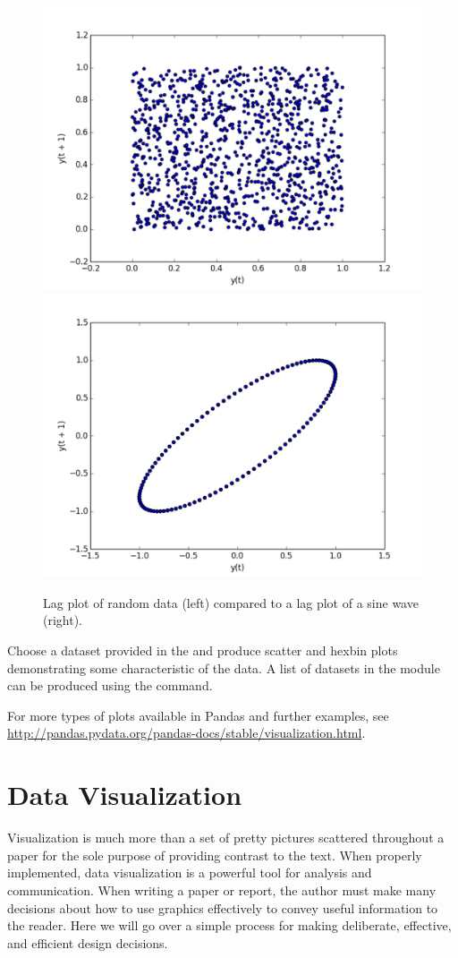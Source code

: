 \begin{figure}[H]
    \centering
    \includegraphics[width=.49\textwidth]{randomdata.pdf}
    \includegraphics[width=.49\textwidth]{structureddata.pdf}
    \caption{Lag plot of random data (left) compared to a lag plot of a sine wave (right).}
\end{figure}


\begin{problem}
Choose a dataset provided in the  and produce scatter and hexbin plots demonstrating some characteristic of the data. A list of datasets in the  module can be produced using the  command.
\end{problem}

For more types of plots available in Pandas and further examples, see \url{http://pandas.pydata.org/pandas-docs/stable/visualization.html}.

\section*{Data Visualization}

Visualization is much more than a set of pretty pictures scattered throughout a paper for the sole purpose of providing contrast to the text.
When properly implemented, data visualization is a powerful tool for analysis and communication.
When writing a paper or report, the author must make many decisions about how to use graphics effectively to convey useful information to the reader.  Here we will go over a simple process for making deliberate, effective, and efficient design decisions.

